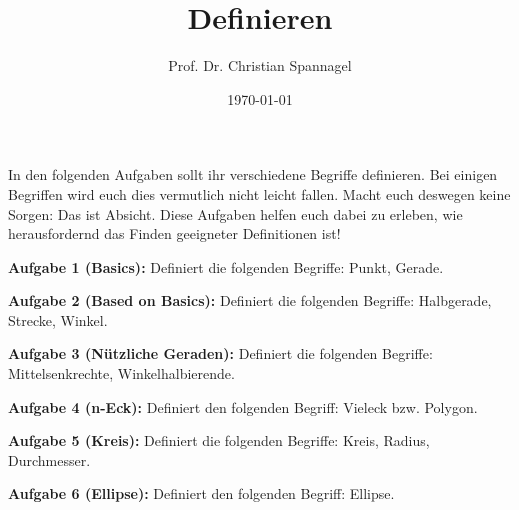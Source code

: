 \documentclass{../cssheet}
\title{Definieren}
\author{Prof. Dr. Christian Spannagel}
\date{\today}
\begin{document}
\printtitle

In den folgenden Aufgaben sollt ihr verschiedene Begriffe definieren. Bei einigen Begriffen wird euch dies vermutlich nicht leicht fallen. Macht euch deswegen keine Sorgen: Das ist Absicht. Diese Aufgaben helfen euch dabei zu erleben, wie herausfordernd das Finden geeigneter Definitionen ist!

\textbf{Aufgabe 1 (Basics):} Definiert die folgenden Begriffe: Punkt, Gerade.

\textbf{Aufgabe 2 (Based on Basics):} Definiert die folgenden Begriffe: Halbgerade, Strecke, Winkel.

\textbf{Aufgabe 3 (Nützliche Geraden):} Definiert die folgenden Begriffe: Mittelsenkrechte, Winkelhalbierende.

\textbf{Aufgabe 4 (n-Eck):} Definiert den folgenden Begriff: Vieleck bzw. Polygon.

\textbf{Aufgabe 5 (Kreis):} Definiert die folgenden Begriffe: Kreis, Radius, Durchmesser.

\textbf{Aufgabe 6 (Ellipse):} Definiert den folgenden Begriff: Ellipse.



\vspace*{10mm}
\printlicense

\printsocials

\end{document}
